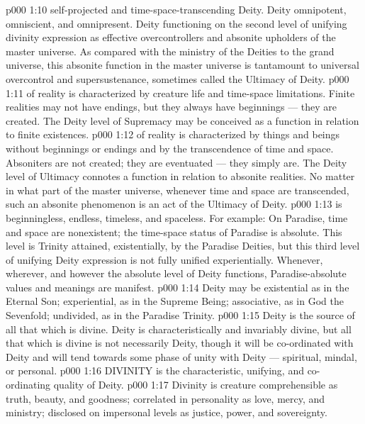 \vs p000 1:10 \bibnobreakspace {} self\hyp{}projected and time\hyp{}space\hyp{}transcending Deity. Deity omnipotent, omniscient, and omnipresent. Deity functioning on the second level of unifying divinity expression as effective overcontrollers and absonite upholders of the master universe. As compared with the ministry of the Deities to the grand universe, this absonite function in the master universe is tantamount to universal overcontrol and supersustenance, sometimes called the Ultimacy of Deity.
\vs p000 1:11 \pc {} of reality is characterized by creature life and time\hyp{}space limitations. Finite realities may not have endings, but they always have beginnings --- they are created. The Deity level of Supremacy may be conceived as a function in relation to finite existences.
\vs p000 1:12 \pc {} of reality is characterized by things and beings without beginnings or endings and by the transcendence of time and space. Absoniters are not created; they are eventuated --- they simply are. The Deity level of Ultimacy connotes a function in relation to absonite realities. No matter in what part of the master universe, whenever time and space are transcended, such an absonite phenomenon is an act of the Ultimacy of Deity.
\vs p000 1:13 \pc {} is beginningless, endless, timeless, and spaceless. For example: On Paradise, time and space are nonexistent; the time\hyp{}space status of Paradise is absolute. This level is Trinity attained, existentially, by the Paradise Deities, but this third level of unifying Deity expression is not fully unified experientially. Whenever, wherever, and however the absolute level of Deity functions, Paradise\hyp{}absolute values and meanings are manifest.
\vs p000 1:14 \pc Deity may be existential as in the Eternal Son; experiential, as in the Supreme Being; associative, as in God the Sevenfold; undivided, as in the Paradise Trinity.
\vs p000 1:15 Deity is the source of all that which is divine. Deity is characteristically and invariably divine, but all that which is divine is not necessarily Deity, though it will be co\hyp{}ordinated with Deity and will tend towards some phase of unity with Deity --- spiritual, mindal, or personal.
\vs p000 1:16 \pc DIVINITY is the characteristic, unifying, and co\hyp{}ordinating quality of Deity.
\vs p000 1:17 Divinity is creature comprehensible as truth, beauty, and goodness; correlated in personality as love, mercy, and ministry; disclosed on impersonal levels as justice, power, and sovereignty.
